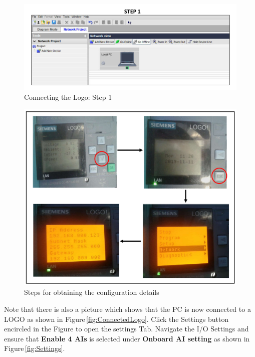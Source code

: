 \documentclass[11pt]{IEEEtran}
\begin{document}
\begin{figure}[H]
	\centering
	\includegraphics[scale=0.72]{Step1.pdf}
	\caption{Connecting the Logo: Step 1}
	\label{fig:network}
\end{figure}

\begin{figure}[H]
	\centering
	\includegraphics[scale=0.7]{NetworkSettings.pdf}
	\caption{Steps for obtaining the configuration details}
	\label{fig:networkDetails}
\end{figure}
\noindent  Note that there is also a picture which shows that the PC is now connected to a LOGO as shown in Figure\,\ref{fig:ConnectedLogo}. Click the Settings button encircled in the Figure to open the settings Tab. Navigate the I/O Settings and ensure that \textbf{Enable 4 AIs} is selected under \textbf{Onboard AI setting} as shown in Figure\,\ref{fig:Settings}. 
\end{document}
